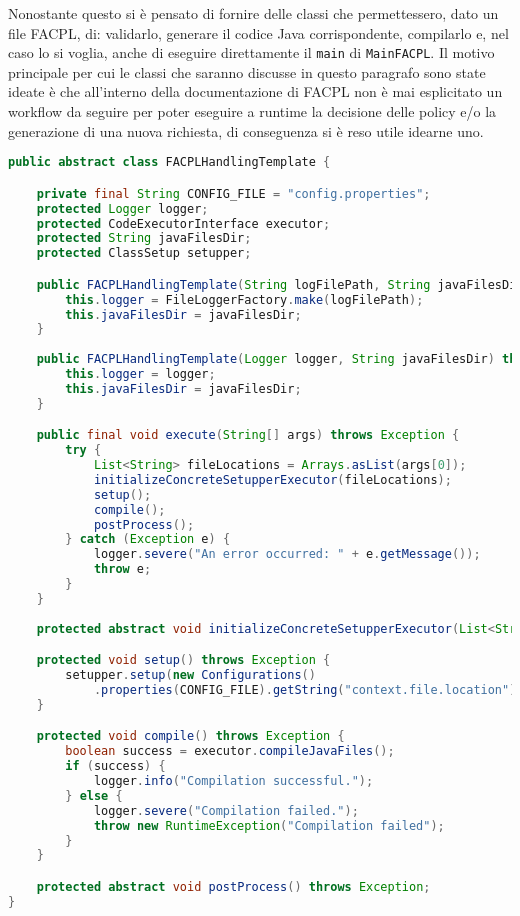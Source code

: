 Nonostante questo si è pensato di fornire delle classi che permettessero, dato un file FACPL, di: validarlo, generare il codice Java corrispondente, compilarlo e, nel caso lo si voglia, anche di eseguire direttamente il \texttt{main} di \texttt{MainFACPL}. Il motivo principale per cui le classi che saranno discusse in questo paragrafo sono state ideate è che all'interno della documentazione di FACPL non è mai esplicitato un workflow da seguire per poter eseguire a runtime la decisione delle policy e/o la generazione di una nuova richiesta, di conseguenza si è reso utile idearne uno.
\begin{lstlisting}[language=Java, caption=Classe FACPLHandlingTemplate, label=code:FACPLHandlingTemplate, basicstyle=\fontsize{8.5}{10}\ttfamily]
public abstract class FACPLHandlingTemplate {

	private final String CONFIG_FILE = "config.properties";
    protected Logger logger;
    protected CodeExecutorInterface executor;
    protected String javaFilesDir;
    protected ClassSetup setupper;

    public FACPLHandlingTemplate(String logFilePath, String javaFilesDir) throws IOException {
        this.logger = FileLoggerFactory.make(logFilePath);
        this.javaFilesDir = javaFilesDir;
    }
    
    public FACPLHandlingTemplate(Logger logger, String javaFilesDir) throws IOException {
        this.logger = logger;
        this.javaFilesDir = javaFilesDir;
    }

    public final void execute(String[] args) throws Exception {
        try {
            List<String> fileLocations = Arrays.asList(args[0]);
            initializeConcreteSetupperExecutor(fileLocations);
            setup();
            compile();
            postProcess();
        } catch (Exception e) {
            logger.severe("An error occurred: " + e.getMessage());
            throw e;
        }
    }
    
    protected abstract void initializeConcreteSetupperExecutor(List<String> fileLocations) throws Exception;

    protected void setup() throws Exception {
        setupper.setup(new Configurations()
            .properties(CONFIG_FILE).getString("context.file.location"), javaFilesDir);
    }

    protected void compile() throws Exception {
        boolean success = executor.compileJavaFiles();
        if (success) {
            logger.info("Compilation successful.");
        } else {
            logger.severe("Compilation failed.");
            throw new RuntimeException("Compilation failed");
        }
    }

    protected abstract void postProcess() throws Exception;
}
\end{lstlisting}
